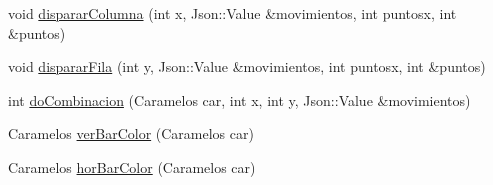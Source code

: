 \begin{DoxyCompactItemize}
\item 
void \hyperlink{classTablero_a0c0e3d24458931072e02d207c805f035}{disparar\-Columna} (int x, Json\-::\-Value \&movimientos, int puntosx, int \&puntos)
\item 
void \hyperlink{classTablero_a745806bc929ae7ff91362fe8e65438be}{disparar\-Fila} (int y, Json\-::\-Value \&movimientos, int puntosx, int \&puntos)
\item 
int \hyperlink{classTablero_a6cb4b69dfb12688eec97e5fb5ed5f3ce}{do\-Combinacion} (Caramelos car, int x, int y, Json\-::\-Value \&movimientos)
\item 
Caramelos \hyperlink{classTablero_ac0c9c00e9a70af36f713df71a2292b59}{ver\-Bar\-Color} (Caramelos car)
\item 
Caramelos \hyperlink{classTablero_aa9f29dd6087b7a528a800ab5e31bbf7b}{hor\-Bar\-Color} (Caramelos car)
\end{DoxyCompactItemize}
